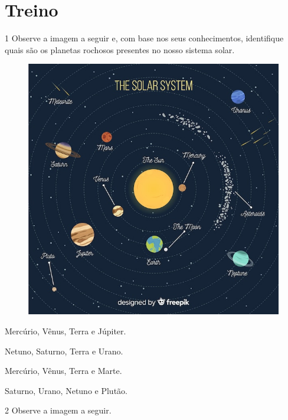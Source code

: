 \section*{Treino}

\num{1} Observe a imagem a seguir e, com base nos seus conhecimentos, identifique quais são os planetas rochosos presentes no nosso sistema solar.

\begin{figure}[htpb!]
\centering
\includegraphics[width=.6\textwidth]{./imgs/img12.jpg}
\end{figure}

\begin{escolha}
\item
  Mercúrio, Vênus, Terra e Júpiter.
\item
  Netuno, Saturno, Terra e Urano.
\item
  Mercúrio, Vênus, Terra e Marte.
\item
  Saturno, Urano, Netuno e Plutão.
\end{escolha}

\num{2} Observe a imagem a seguir.

